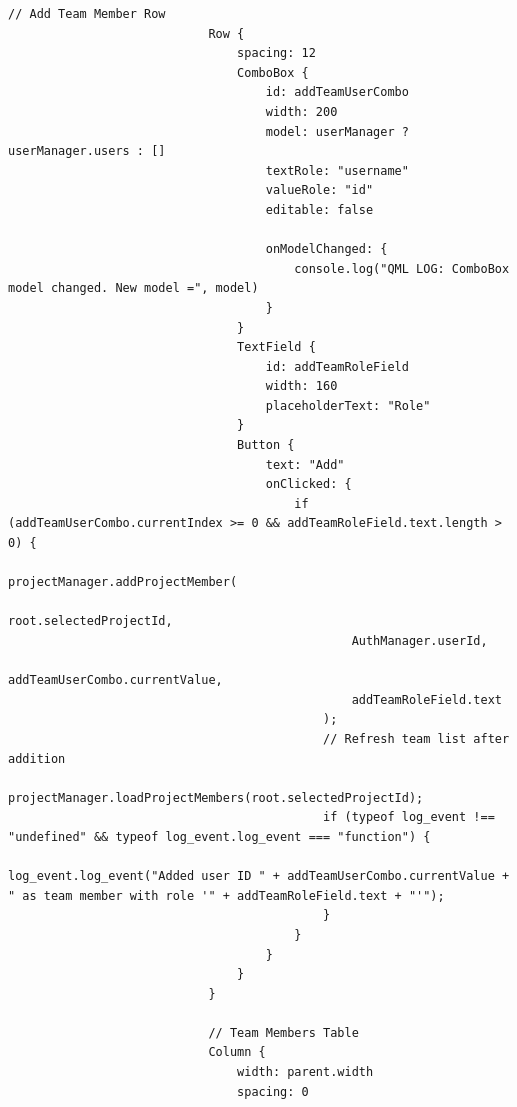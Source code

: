 \documentclass{report}
\begin{document}
\begin{lstlisting}[style=qmlstyle]
                            // Add Team Member Row
                            Row {
                                spacing: 12
                                ComboBox {
                                    id: addTeamUserCombo
                                    width: 200
                                    model: userManager ? userManager.users : []
                                    textRole: "username"
                                    valueRole: "id"
                                    editable: false

                                    onModelChanged: {
                                        console.log("QML LOG: ComboBox model changed. New model =", model)
                                    }
                                }
                                TextField {
                                    id: addTeamRoleField
                                    width: 160
                                    placeholderText: "Role"
                                }
                                Button {
                                    text: "Add"
                                    onClicked: {
                                        if (addTeamUserCombo.currentIndex >= 0 && addTeamRoleField.text.length > 0) {
                                            projectManager.addProjectMember(
                                                root.selectedProjectId,
                                                AuthManager.userId,
                                                addTeamUserCombo.currentValue,
                                                addTeamRoleField.text
                                            );
                                            // Refresh team list after addition
                                            projectManager.loadProjectMembers(root.selectedProjectId);
                                            if (typeof log_event !== "undefined" && typeof log_event.log_event === "function") {
                                                log_event.log_event("Added user ID " + addTeamUserCombo.currentValue + " as team member with role '" + addTeamRoleField.text + "'");
                                            }
                                        }
                                    }
                                }
                            }

                            // Team Members Table
                            Column {
                                width: parent.width
                                spacing: 0


\end{lstlisting}
\end{document}
